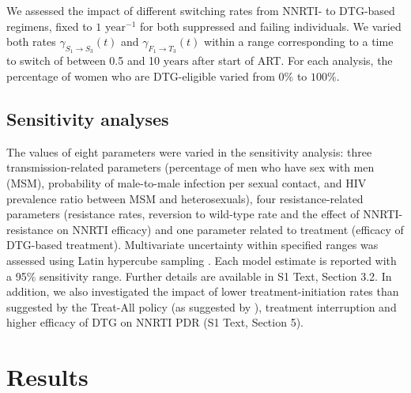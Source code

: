 \documentclass[10pt,letterpaper]{article}
\begin{document}
We assessed the impact of different switching rates from NNRTI- to DTG-based regimens, fixed to $1 \text{ year}^{-1}$ for both suppressed and failing individuals. We varied both rates $\gamma_{S_1\rightarrow S_3}^{}(t)$ and $\gamma_{F_1\rightarrow T_3}^{}(t)$ within a range corresponding to a time to switch of between 0.5 and 10 $\text{years}$  after start of ART. For each analysis, the percentage of women who are DTG-eligible varied from $0\%$ to $100\%$.

\subsection*{Sensitivity analyses}
The values of eight parameters were varied in the sensitivity analysis: three transmission-related parameters (percentage of men who have sex with men (MSM), probability of male-to-male infection per sexual contact, and HIV prevalence ratio between MSM and heterosexuals), four resistance-related parameters (resistance rates, reversion to wild-type rate and the effect of NNRTI-resistance on NNRTI efficacy) and one parameter related to treatment (efficacy of DTG-based treatment). Multivariate uncertainty within specified ranges was assessed using Latin hypercube sampling \cite{Seaholm1988}. Each model estimate is reported with a 95\% sensitivity range. Further details are available in S1 Text, Section 3.2. In addition, we also investigated the impact of lower treatment-initiation rates than suggested by the Treat-All policy (as suggested by \cite{Boyer2016}), treatment interruption and higher efficacy of DTG on NNRTI PDR (S1 Text, Section 5).

\section*{Results}
\end{document}
